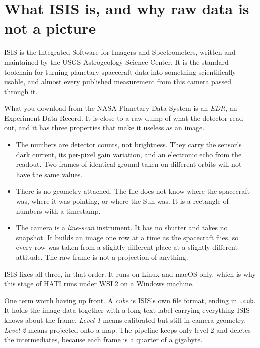 \documentclass[11pt]{article}
\begin{document}
\section{What ISIS is, and why raw data is not a picture}

ISIS is the Integrated Software for Imagers and Spectrometers, written and maintained
by the USGS Astrogeology Science Center. It is the standard toolchain for turning
planetary spacecraft data into something scientifically usable, and almost every
published measurement from this camera passed through it.

What you download from the NASA Planetary Data System is an \emph{EDR}, an Experiment
Data Record. It is close to a raw dump of what the detector read out, and it has
three properties that make it useless as an image.

\begin{itemize}
\item The numbers are detector counts, not brightness. They carry the sensor's dark
current, its per-pixel gain variation, and an electronic echo from the readout. Two
frames of identical ground taken on different orbits will not have the same values.
\item There is no geometry attached. The file does not know where the spacecraft was,
where it was pointing, or where the Sun was. It is a rectangle of numbers with a
timestamp.
\item The camera is a \emph{line-scan} instrument. It has no shutter and takes no
snapshot. It builds an image one row at a time as the spacecraft flies, so every row
was taken from a slightly different place at a slightly different attitude. The raw
frame is not a projection of anything.
\end{itemize}

ISIS fixes all three, in that order. It runs on Linux and macOS only, which is why
this stage of HATI runs under WSL2 on a Windows machine.

One term worth having up front. A \emph{cube} is ISIS's own file format, ending in
\texttt{.cub}. It holds the image data together with a long text label carrying
everything ISIS knows about the frame. \emph{Level 1} means calibrated but still in
camera geometry. \emph{Level 2} means projected onto a map. The pipeline keeps only
level 2 and deletes the intermediates, because each frame is a quarter of a gigabyte.

\end{document}
